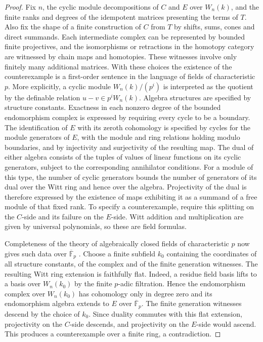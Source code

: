 \documentclass[12pt,a4paper,english,reqno]{amsart}
\numberwithin{equation}{section}
\theoremstyle{plain}
\theoremstyle{definition}
\begin{document}
\begin{proof}
Fix $n$, the cyclic module decompositions of $C$ and $E$ over
$W_n(k)$, and the finite ranks and degrees of the idempotent
matrices presenting the terms of $T$. Also fix the shape of a
finite construction of $C$ from $T$ by shifts, sums, cones and
direct summands. Each intermediate complex can be represented
by bounded finite projectives, and the isomorphisms or
retractions in the homotopy category are witnessed by chain
maps and homotopies. These witnesses involve only finitely
many additional matrices. With these choices the existence
of the counterexample is a first-order sentence in the
language of fields of characteristic $p$. More explicitly,
a cyclic module $W_n(k)/(p^i)$ is interpreted as the quotient
by the definable relation $u-v\in p^iW_n(k)$. Algebra structures
are specified by structure constants. Exactness in each
nonzero degree of the bounded endomorphism complex is expressed
by requiring every cycle to be a boundary. The identification
of $E$ with its zeroth cohomology is specified by cycles for
the module generators of $E$, with the module and ring relations
holding modulo boundaries, and by injectivity and surjectivity
of the resulting map. The dual of either algebra consists
of the tuples of values of linear functions on its cyclic
generators, subject to the corresponding annihilator
conditions. For a module of this type, the number of cyclic
generators bounds the number of generators of its dual over the
Witt ring and hence over the algebra. Projectivity of the dual
is therefore expressed by the existence of maps exhibiting it
as a summand of a free module of that fixed rank. To specify
a counterexample, require this splitting on the $C$-side and
its failure on the $E$-side. Witt addition and multiplication
are given by universal polynomials, so these are field formulas.

Completeness of the theory of algebraically closed fields of
characteristic $p$ now gives such data over $\overline{\mathbb F}_p$
\cite{BodirskyModelTheory}. Choose a finite subfield $k_0$
containing the coordinates of all structure constants, of the
complex and of the finite generation witnesses. The resulting
Witt ring extension is faithfully flat. Indeed, a residue
field basis lifts to a basis over $W_n(k_0)$ by the finite
$p$-adic filtration. Hence the endomorphism complex over
$W_n(k_0)$ has cohomology only in degree zero and its
endomorphism algebra extends to $E$ over $\overline{\mathbb F}_p$.
The finite generation witnesses descend by the choice of
$k_0$. Since duality commutes with this flat extension,
projectivity on the $C$-side descends, and projectivity
on the $E$-side would ascend. This produces a counterexample
over a finite ring, a contradiction.
\end{proof}
\end{document}
